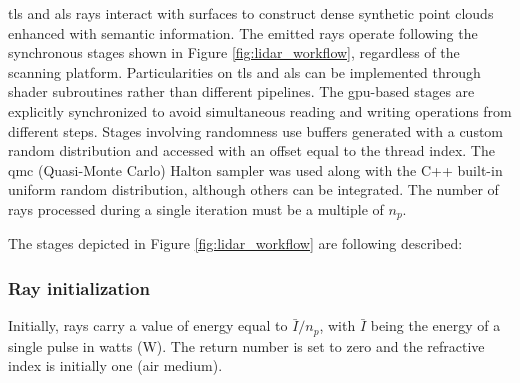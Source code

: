 \acrshort{tls} and \acrshort{als} rays interact with surfaces to construct dense synthetic point clouds enhanced with semantic information. The emitted rays operate following the synchronous stages shown in Figure \ref{fig:lidar_workflow}, regardless of the scanning platform. Particularities on \acrshort{tls} and \acrshort{als} can be implemented through shader subroutines rather than different pipelines. The \acrshort{gpu}-based stages are explicitly synchronized to avoid simultaneous reading and writing operations from different steps. Stages involving randomness use buffers generated with a custom random distribution and accessed with an offset equal to the thread index. The \acrshort{qmc} (Quasi-Monte Carlo) Halton sampler was used along with the C++ built-in uniform random distribution, although others can be integrated. The number of rays processed during a single iteration must be a multiple of $n_{p}$.

The stages depicted in Figure \ref{fig:lidar_workflow} are following described:

\subsubsection{Ray initialization}

Initially, rays carry a value of energy equal to $\bar{I} / n_{p}$, with $\bar{I}$ being the energy of a single pulse in watts (\si{\watt}). The return number is set to zero and the refractive index is initially one (air medium). 

